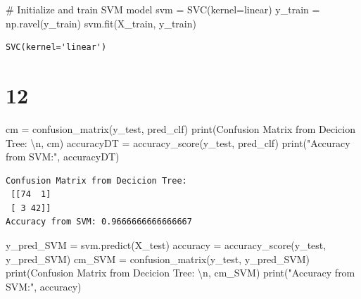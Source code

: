 \documentclass[
  11pt,
  letterpaper,
  DIV=11,
  numbers=noendperiod]{scrartcl}
\newenvironment{Shaded}{\begin{snugshade}}{\end{snugshade}}
\newcommand{\BuiltInTok}[1]{\textcolor[rgb]{0.00,0.23,0.31}{#1}}
\newcommand{\CharTok}[1]{\textcolor[rgb]{0.13,0.47,0.30}{#1}}
\newcommand{\CommentTok}[1]{\textcolor[rgb]{0.37,0.37,0.37}{#1}}
\newcommand{\NormalTok}[1]{\textcolor[rgb]{0.00,0.23,0.31}{#1}}
\newcommand{\OperatorTok}[1]{\textcolor[rgb]{0.37,0.37,0.37}{#1}}
\newcommand{\StringTok}[1]{\textcolor[rgb]{0.13,0.47,0.30}{#1}}
\begin{document}
\begin{Shaded}
\begin{Highlighting}[]
\CommentTok{\# Initialize and train SVM model}
\NormalTok{svm }\OperatorTok{=}\NormalTok{ SVC(kernel}\OperatorTok{=}\StringTok{\textquotesingle{}linear\textquotesingle{}}\NormalTok{)}
\NormalTok{y\_train }\OperatorTok{=}\NormalTok{ np.ravel(y\_train)}
\NormalTok{svm.fit(X\_train, y\_train)}

\end{Highlighting}
\end{Shaded}

\begin{verbatim}
SVC(kernel='linear')
\end{verbatim}

\section{12}\label{section-6}

\begin{Shaded}
\begin{Highlighting}[]
\NormalTok{cm }\OperatorTok{=}\NormalTok{ confusion\_matrix(y\_test, pred\_clf)}
\BuiltInTok{print}\NormalTok{(}\StringTok{\textquotesingle{}Confusion Matrix from Decicion Tree: }\CharTok{\textbackslash{}n}\StringTok{\textquotesingle{}}\NormalTok{, cm)}
\NormalTok{accuracyDT }\OperatorTok{=}\NormalTok{ accuracy\_score(y\_test, pred\_clf)}
\BuiltInTok{print}\NormalTok{(}\StringTok{"Accuracy from SVM:"}\NormalTok{, accuracyDT)}
\end{Highlighting}
\end{Shaded}

\begin{verbatim}
Confusion Matrix from Decicion Tree: 
 [[74  1]
 [ 3 42]]
Accuracy from SVM: 0.9666666666666667
\end{verbatim}

\begin{Shaded}
\begin{Highlighting}[]
\NormalTok{y\_pred\_SVM }\OperatorTok{=}\NormalTok{ svm.predict(X\_test)}
\NormalTok{accuracy }\OperatorTok{=}\NormalTok{ accuracy\_score(y\_test, y\_pred\_SVM)}
\NormalTok{cm\_SVM }\OperatorTok{=}\NormalTok{ confusion\_matrix(y\_test, y\_pred\_SVM)}
\BuiltInTok{print}\NormalTok{(}\StringTok{\textquotesingle{}Confusion Matrix from Decicion Tree: }\CharTok{\textbackslash{}n}\StringTok{\textquotesingle{}}\NormalTok{, cm\_SVM)}
\BuiltInTok{print}\NormalTok{(}\StringTok{"Accuracy from SVM:"}\NormalTok{, accuracy)}
\end{Highlighting}
\end{Shaded}
\end{document}
